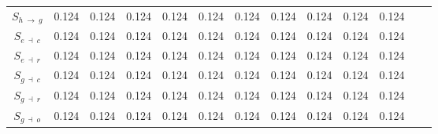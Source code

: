 \begin{ThreePartTable}
\begin{longtable}{c l *{10}{c} c}
        $S_{h \: \rightarrow \: g}$          & 0.124                    & 0.124 & 0.124 & 0.124 & 0.124 & 0.124 & 0.124 & 0.124 & 0.124 & 0.124 \\

        $S_{e \: \dashv \: c}$               & 0.124                    & 0.124 & 0.124 & 0.124 & 0.124 & 0.124 & 0.124 & 0.124 & 0.124 & 0.124 \\

        $S_{e \: \dashv \: r}$               & 0.124                    & 0.124 & 0.124 & 0.124 & 0.124 & 0.124 & 0.124 & 0.124 & 0.124 & 0.124 \\

        $S_{g \: \dashv \: c}$               & 0.124                    & 0.124 & 0.124 & 0.124 & 0.124 & 0.124 & 0.124 & 0.124 & 0.124 & 0.124 \\

        $S_{g \: \dashv \: r}$               & 0.124                    & 0.124 & 0.124 & 0.124 & 0.124 & 0.124 & 0.124 & 0.124 & 0.124 & 0.124 \\

        $S_{g \: \dashv \: o}$               & 0.124                    & 0.124 & 0.124 & 0.124 & 0.124 & 0.124 & 0.124 & 0.124 & 0.124 & 0.124 \\
    \end{longtable}
\end{ThreePartTable}

